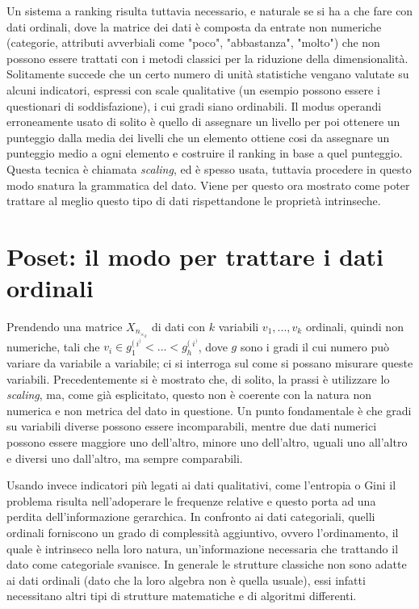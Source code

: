 \documentclass{report}
\begin{document}
Un sistema a ranking risulta tuttavia necessario, e naturale se si ha a che fare con dati ordinali, dove la matrice dei dati è composta da entrate non numeriche (categorie, attributi avverbiali come "poco", "abbastanza", "molto") che non possono essere trattati con i metodi classici per la riduzione della dimensionalità. Solitamente succede che un certo numero di unità statistiche vengano valutate su alcuni indicatori, espressi con scale qualitative (un esempio possono essere i questionari di soddisfazione), i cui gradi siano ordinabili. Il modus operandi erroneamente usato di solito è quello di assegnare un livello per poi ottenere un punteggio dalla media dei livelli che un elemento ottiene cosi da assegnare un punteggio medio a ogni elemento e costruire il ranking in base a quel punteggio. Questa tecnica è chiamata \textit{scaling}, ed è spesso usata, tuttavia procedere in questo modo snatura la grammatica del dato. Viene per questo ora mostrato come poter trattare al meglio questo tipo di dati rispettandone le proprietà intrinseche. 


\chapter{Poset: il modo per trattare i dati ordinali}
Prendendo una matrice $X_n_\times_k$ di dati con $k$ variabili $v_1, ..., v_k$ ordinali, quindi non numeriche, tali che $v_i \in g_1^(^i^)<...< g_h^(^i^)$, dove $g$ sono i gradi il cui numero può variare da variabile a variabile; ci si interroga sul come si possano misurare queste variabili. Precedentemente si è mostrato che, di solito, la prassi è utilizzare lo \textit{scaling}, ma, come già esplicitato, questo non è coerente con la natura non numerica e non metrica del dato in questione. Un punto fondamentale è che gradi su variabili diverse possono essere incomparabili, mentre due dati numerici possono essere maggiore uno dell'altro, minore uno dell'altro, uguali uno all'altro e diversi uno dall'altro, ma sempre comparabili.


Usando invece indicatori più legati ai dati qualitativi, come l'entropia o Gini il problema risulta nell'adoperare le frequenze relative e questo porta ad una perdita dell'informazione gerarchica. In confronto ai dati categoriali, quelli ordinali forniscono un grado di complessità aggiuntivo, ovvero l'ordinamento, il quale è intrinseco nella loro natura, un'informazione necessaria che trattando il dato come categoriale svanisce. In generale le strutture classiche non sono adatte ai dati ordinali (dato che la loro algebra non è quella usuale), essi infatti necessitano altri tipi di strutture matematiche e di algoritmi differenti.\\
\end{document}
